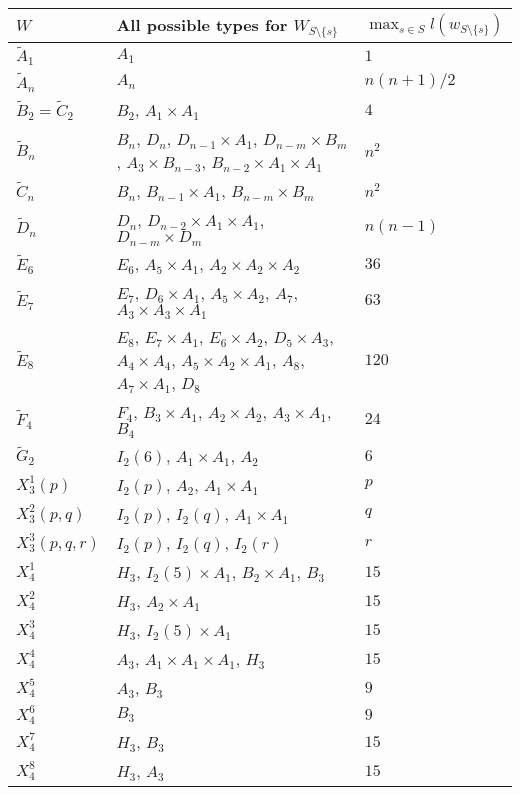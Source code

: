 \begin{table}[ht]
	\centering
	\begin{tabular}{l|p{7cm}|l}
		$W$ & All possible types for $W_{S \setminus \{s\}}$ & $\max_{s \in S} l(w_{S \setminus \{s\}})$ \\
		\hline
		$\tilde A_1$ & $A_1$ & $1$ \\
		$\tilde A_n$ & $A_n$ & $n(n+1)/2$ \\
		$\tilde B_2 = \tilde C_2$ & $B_2$, $A_1 \times A_1$ & $4$ \\
		$\tilde B_n$ & $B_n$, $D_n$, $D_{n-1} \times A_1$, $D_{n-m} \times B_m$, $A_3 \times B_{n-3}$, $B_{n-2} \times A_1 \times A_1$ & $n^2$ \\
		$\tilde C_n$ & $B_n$, $B_{n-1} \times A_1$, $B_{n-m} \times B_m$ & $n^2$ \\
		$\tilde D_n$ & $D_n$, $D_{n-2} \times A_1 \times A_1$, $D_{n-m} \times D_m$ & $n(n-1)$ \\
		$\tilde E_6$ & $E_6$, $A_5 \times A_1$, $A_2 \times A_2 \times A_2$ & $36$ \\
		$\tilde E_7$ & $E_7$, $D_6 \times A_1$, $A_5 \times A_2$, $A_7$, $A_3 \times A_3 \times A_1$ & $63$ \\
		$\tilde E_8$ & $E_8$, $E_7 \times A_1$, $E_6 \times A_2$, $D_5 \times A_3$, $A_4 \times A_4$, $A_5 \times A_2 \times A_1$, $A_8$, $A_7 \times A_1$, $D_8$ & $120$ \\
		$\tilde F_4$ & $F_4$, $B_3 \times A_1$, $A_2 \times A_2$, $A_3 \times A_1$, $B_4$ & $24$ \\
		$\tilde G_2$ & $I_2(6)$, $A_1 \times A_1$, $A_2$ & $6$ \\
		$X_3^1(p)$ & $I_2(p)$, $A_2$, $A_1 \times A_1$ & $p$ \\
		$X_3^2(p,q)$ & $I_2(p)$, $I_2(q)$, $A_1 \times A_1$ & $q$  \\
		$X_3^3(p,q,r)$ & $I_2(p)$, $I_2(q)$, $I_2(r)$ & $r$  \\
		$X_4^1$ & $H_3$, $I_2(5) \times A_1$, $B_2 \times A_1$, $B_3$ & $15$ \\
		$X_4^2$ & $H_3$, $A_2 \times A_1$ & $15$ \\
		$X_4^3$ & $H_3$, $I_2(5) \times A_1$ & $15$ \\
		$X_4^4$ & $A_3$, $A_1 \times A_1 \times A_1$, $H_3$ & $15$ \\
		$X_4^5$ & $A_3$, $B_3$ & $9$ \\
		$X_4^6$ & $B_3$ & $9$ \\
		$X_4^7$ & $H_3$, $B_3$ & $15$ \\
		$X_4^8$ & $H_3$, $A_3$ & $15$ \\

\end{tabular}
\end{table}
